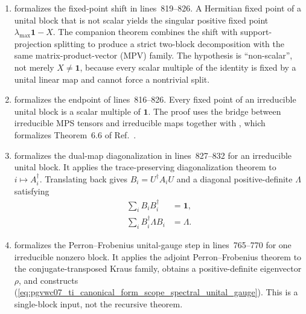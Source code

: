 \documentclass{article}
\begin{document}
\begin{enumerate}
    \item
          formalizes the fixed-point shift in lines~819--826. A Hermitian
          fixed point of a unital block that is not scalar yields the singular
          positive fixed point $\lambda_{\max}\mathbf{1}-X$. The companion
          theorem
          combines the shift with support-projection splitting to produce a
          strict two-block decomposition with the same matrix-product-vector
          (MPV) family. The hypothesis is ``non-scalar'', not merely
          $X\neq\mathbf{1}$, because every scalar multiple of the identity is
          fixed by a unital linear map and cannot force a nontrivial split.

    \item
          formalizes the endpoint of lines~816--826. Every fixed point of an
          irreducible unital block is a scalar multiple of $\mathbf{1}$. The
          proof uses the bridge between irreducible MPS tensors and irreducible
          maps together with
          , which
          formalizes Theorem~6.6 of Ref.~\cite{Wolf2012Quantum}.

    \item
          formalizes the dual-map diagonalization in lines~827--832 for an
          irreducible unital block. It applies the trace-preserving
          diagonalization theorem to $i\mapsto A_i^\dagger$. Translating back
          gives $B_i=U^\dagger A_iU$ and a diagonal positive-definite
          $\Lambda$ satisfying
          \begin{align}
              \sum_i B_iB_i^\dagger
                  &= \mathbf{1},
              \label{eq:pgvwc07_ti_canonical_form_scope_dual_diag_unital}\\
              \sum_i B_i^\dagger\Lambda B_i
                  &= \Lambda.
              \label{eq:pgvwc07_ti_canonical_form_scope_dual_diag_fixed_point}
          \end{align}

    \item
           formalizes the
          Perron--Frobenius unital-gauge step in lines~765--770 for one
          irreducible nonzero block. It applies the adjoint
          Perron--Frobenius theorem to the conjugate-transposed Kraus family,
          obtains a positive-definite eigenvector $\rho$, and constructs
          (\ref{eq:pgvwc07_ti_canonical_form_scope_spectral_unital_gauge}).
          This is a single-block input, not the recursive theorem.


\end{enumerate}
\end{document}
